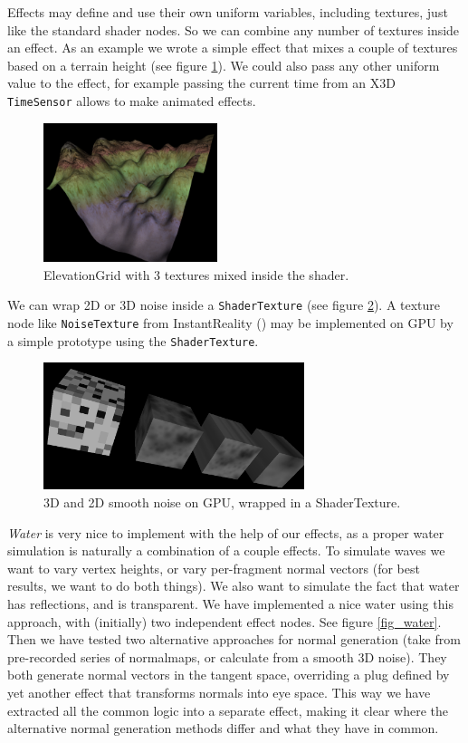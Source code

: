 \documentclass{egpubl}
\begin{document}
Effects may define and use their own uniform variables, including textures,
just like the standard shader nodes. So we can combine any number of textures
inside an effect. As an example we wrote a simple effect that mixes a couple of
textures based on a terrain height (see figure \ref{fig_terrain}).
We could also pass any other uniform value to the effect, for example
passing the current time from an X3D \texttt{TimeSensor} allows to make
animated effects.

\begin{figure}[H]
  \centering
  \includegraphics[width=2in]{terrain}
  \caption{ElevationGrid with 3 textures mixed inside the shader.}
  \label{fig_terrain}
\end{figure}

We can wrap 2D or 3D noise inside a \texttt{ShaderTexture}
(see figure \ref{fig_noise}).
A texture node like \texttt{NoiseTexture} from InstantReality
(\cite{instant:noisetex})
may be implemented on GPU by a simple prototype using the \texttt{ShaderTexture}.

\begin{figure}[H]
  \centering
  \includegraphics[width=3in]{noise-cropped}
  \caption{3D and 2D smooth noise on GPU, wrapped in a ShaderTexture.}
  \label{fig_noise}
\end{figure}

\emph{Water} is very nice to implement with the help of our effects,
as a proper water simulation
is naturally a combination of a couple effects.
To simulate waves we want to vary vertex
heights, or vary per-fragment normal vectors (for best results,
we want to do both things).
We also want to simulate the fact that water has reflections, and
is transparent. We have implemented a nice water using this approach,
with (initially) two independent effect nodes. See figure \ref{fig_water}.
Then we have tested two alternative
approaches for normal generation (take from pre-recorded series of normalmaps,
or calculate from a smooth 3D noise). They both generate normal
vectors in the tangent space, overriding a plug defined by yet another effect
that transforms normals into eye space.
This way we have extracted all the common logic into a separate effect,
making it clear where the alternative normal generation methods differ
and what they have in common.
\end{document}
